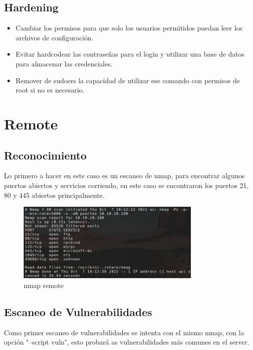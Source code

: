 \documentclass{article}
\begin{document}
\subsection{Hardening}
\begin{itemize}
	\item Cambiar los permisos para que solo los usuarios permitidos puedan leer los archivos de configuración.
	\item Evitar hardcodear las contraseñas para el login y utilizar una base de datos para almacenar las credenciales.
	\item Remover de sudoers la capacidad de utilizar ese comando con permisos de root si no es necesario.
\end{itemize}

\clearpage
\section{Remote}
\subsection{Reconocimiento}
Lo primero a hacer en este caso es un escaneo de nmap, para encontrar algunos puertos abiertos y servicios corriendo, en este caso se encontraron los puertos 21, 80 y 445 abiertos principalmente.

\begin{figure}[h]
	\center
	\includegraphics[width=0.8\textwidth]{images/remote/nmap_remote.png}
	\caption{nmap remote}
\end{figure}
 
\subsection{Escaneo de Vulnerabilidades}

Como primer escaneo de vulnerabilidades se intenta con el mismo nmap, con la opción "--script vuln", esto probará as vulnerabilidades más comunes en el server.
\end{document}
